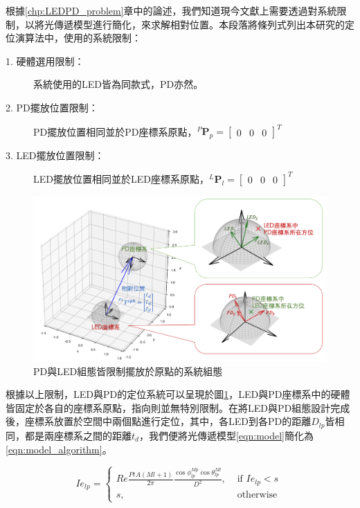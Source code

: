 根據\ref{chp:LEDPD_problem}章中的論述，我們知道現今文獻上需要透過對系統限制，以將光傳遞模型進行簡化，來求解相對位置。本段落將條列式列出本研究的定位演算法中，使用的系統限制：

    \begin{description}

        \item[1. 硬體選用限制：]系統使用的LED皆為同款式，PD亦然。
        \item[2. PD擺放位置限制：]PD擺放位置相同並於PD座標系原點，$^P\boldsymbol{P}_p=
        \left[\begin{array}{ccc}0&0&0\end{array}\right]^T$
        \item[3. LED擺放位置限制：]LED擺放位置相同並於LED座標系原點，$^L\boldsymbol{P}_l=
        \left[\begin{array}{ccc}0&0&0\end{array}\right]^T$

    \end{description}
   
    \begin{figure}[h!]
        \centering
        \includegraphics[width=14cm]{ch3pic/algorithm_place.png}
        \caption{PD與LED組態皆限制擺放於原點的系統組態}
        \label{pic:algorithm_coor}
    \end{figure}

    根據以上限制，LED與PD的定位系統可以呈現於圖\ref{pic:algorithm_coor}，LED與PD座標系中的硬體皆固定於各自的座標系原點，指向則並無特別限制。在將LED與PD組態設計完成後，座標系放置於空間中兩個點進行定位，其中，各LED到各PD的距離$D_{lp}$皆相同，都是兩座標系之間的距離$t_d$，我們便將光傳遞模型\ref{eqn:model}簡化為\ref{eqn:model_algorithm}。

    \begin{equation}
        \label{eqn:model_algorithm}
        Ie_{lp} = \begin{cases}Re\frac{PtA(Ml+1)}{2\pi}\frac{\cos\phi_{lp}^{Mp}\cos \theta_{lp}^{Ml}}{D^2} , & \text { if } Ie_{lp}<s \\ s, & \text { otherwise }\end{cases}
    \end{equation}

